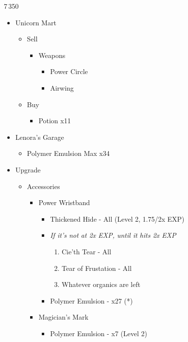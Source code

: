 \begin{multicols}{2}
\begin{shop}{7\,350}
\begin{itemize}
    \item Unicorn Mart
    \begin{itemize}
        \item Sell
        \begin{itemize}
            \item Weapons
            \begin{itemize}
                \item Power Circle
                \item Airwing
            \end{itemize}
        \end{itemize}
        \item Buy
		\begin{itemize}
			\item Potion x11
		\end{itemize}
    \end{itemize}
    \item Lenora's Garage
	\begin{itemize}
		\item Polymer Emulsion Max x34
	\end{itemize}
\end{itemize}
\end{shop}
\begin{upgrade}
\begin{itemize}
    \item Upgrade
    \begin{itemize}
        \item Accessories
        \begin{itemize}
            \item Power Wristband
            \begin{itemize}
                \item Thickened Hide - All (Level 2, 1.75/2x EXP)
                \item \textit{If it's not at 2x EXP, until it hits 2x EXP}
                \begin{enumerate}
                    \item Cie'th Tear - All
                    \item Tear of Frustation - All
                    \item Whatever organics are left
                \end{enumerate}
                \item Polymer Emulsion - x27 (*)
            \end{itemize}
			\item Magician's Mark
			\begin{itemize}
				\item Polymer Emulsion - x7 (Level 2)
			\end{itemize}
        \end{itemize}
    \end{itemize}
\end{itemize}
\end{upgrade}
\end{multicols}
